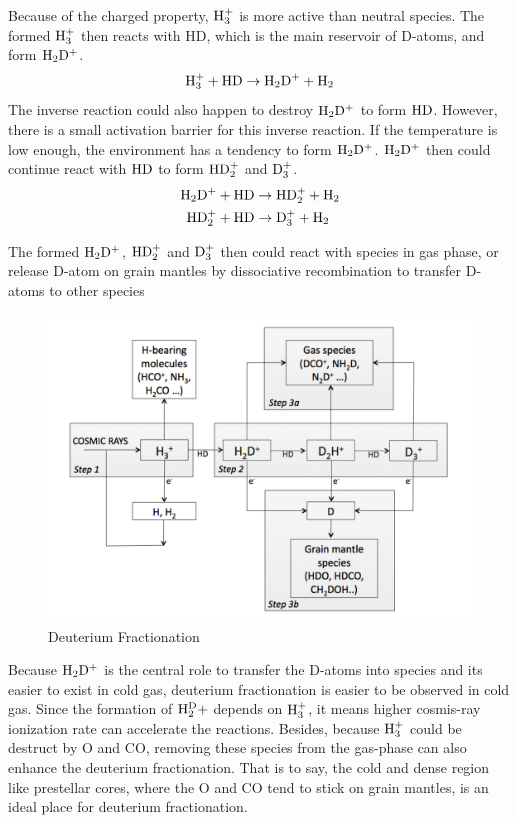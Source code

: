 Because of the charged property, $\rm H_3^+$ is more active than neutral species. The formed $\rm H_3^+$ then reacts with HD, which is the main reservoir of D-atoms, and form $\rm H_2D^+$.
\begin{equation}
    \rm H_3^+ + HD \rightarrow H_2D^+ + H_2
    \label{eq:dfrac2ndstep}
\end{equation}
The inverse reaction could also happen to destroy $\rm H_2D^+$ to form $\rm HD$. However, there is a small activation barrier for this inverse reaction. If the temperature is low enough, the environment has a tendency to form $\rm H_2D^+$. $\rm H_2D^+$ then could continue react with $\rm HD$ to form $\rm HD_2^+$ and $\rm D_3^+$.
\begin{equation}
    \begin{split}
        \rm H_2D^+ + HD &\rightarrow \rm HD_2^+ + H_2 \\
        \rm HD_2^+ + HD &\rightarrow \rm D_3^+ + H_2 \\
    \end{split}
\end{equation}

The formed $\rm H_2D^+$, $\rm HD_2^+$ and $\rm D_3^+$ then could react with species in gas phase, or release D-atom on grain mantles by dissociative recombination to transfer D-atoms to other species


\begin{figure}
    \centering
    \includegraphics[width=0.9\linewidth]{kappa/images/sec2-fig1.pdf}
    \caption{Deuterium Fractionation}
    \label{fig:dfracstep}
\end{figure}

Because $\rm H_2D^+$ is the central role to transfer the D-atoms into species and its easier to exist in cold gas, deuterium fractionation is easier to be observed in cold gas. Since the formation of $\rm H_2^D+$ depends on $\rm H_3^+$, it means higher cosmis-ray ionization rate can accelerate the reactions. Besides, because $\rm H_3^+$ could be destruct by O and CO, removing these species from the gas-phase can also enhance the deuterium fractionation. That is to say, the cold and dense region like prestellar cores, where the O and CO tend to stick on grain mantles, is an ideal place for deuterium fractionation.

